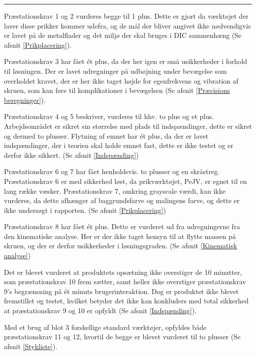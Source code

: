  \plainbreak{1}      
Præstationskrav 1 og 2 vurderes begge til 1 plus. Dette er gjort da værktøjet der laver disse prikker kommer udefra, og de mål der bliver angivet ikke nødvendigvis er lavet på de metalflader og det miljø der skal bruges i DIC sammenhæng (Se afsnit \ref{Prikplacering}).

Præstationskrav 3 har fået ét plus, da der her igen er små usikkerheder i forhold til løsningen. Der er lavet udregninger på udbøjning under bevægelse som overholdet kravet, der er her ikke taget højde for egenfrekvens og vibration af skruen, som kan føre til komplikationer i bevægelsen (Se afsnit \ref{Præcisions beregninger}).

Præstationskrav 4 og 5 beskriver, vurderes til hhv. to plus og et plus. Arbejdsområdet er sikret sin størrelse med plads til indspændinger, dette er sikret og dermed to plusser. Flytning af emnet har ét plus, da der er lavet indspændinger, der i teorien skal holde emnet fast, dette er ikke testet og er derfor ikke sikkert. (Se afsnit \ref{Indspænding})

Præstationskrav 6 og 7 har fået henholdsvis. to plusser og en skråstreg. Præstationskrav 6 er med sikkerhed løst, da prikværktøjet, PeJV, er egnet til en lang række væsker. Præstationskrav 7, omkring grayscale værdi, kan ikke vurderes, da dette afhænger af baggrundsfarve og malingens farve, og dette er ikke undersøgt i rapporten. (Se afsnit \ref{Prikplacering})

Præstationskrav 8 har fået ét plus. Dette er vurderet ud fra udregningerne fra den kinematiske analyse. Her er der ikke taget hensyn til at flytte massen på skruen, og der er derfor usikkerheder i løsningsgraden. (Se afsnit \ref{Kinematisk analyse})

Det er blevet vurderet at produktets opsætning ikke overstiger de 10 minutter, som præstationskrav 10 frem sætter, samt heller ikke overstiger præstationskrav 9's begrænsning på ét minuts brugerinteraktion. Dog er produktet ikke blevet fremstillet og testet, hvilket betyder det ikke kan konkluders med total sikkerhed at præstationskrav 9 og 10 er opfyldt (Se afsnit \ref{Indspænding}).

Med et brug af blot 3 forskellige standard værktøjer, opfyldes både præstationskrav 11 og 12, hvortil de begge er blevet vurderet til to plusser (Se afsnit \ref{Stykliste}).













